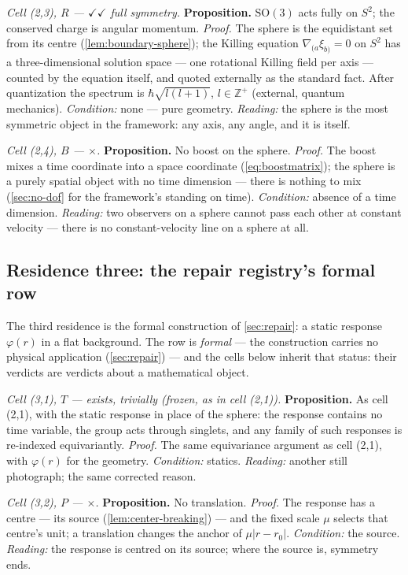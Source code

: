\documentclass[11pt]{amsbook}
\theoremstyle{plain}
\theoremstyle{definition}
\theoremstyle{remark}
\begin{document}
\emph{Cell (2,3), $R$ --- $\checkmark\checkmark$ full symmetry.} \textbf{Proposition.} $\mathrm{SO}(3)$ acts fully on $S^{2}$; the conserved charge is angular momentum. \emph{Proof.} The sphere is the equidistant set from its centre (\cref{lem:boundary-sphere}); the Killing equation $\nabla_{(a}\xi_{b)} = 0$ on $S^{2}$ has a three-dimensional solution space --- one rotational Killing field per axis --- counted by the equation itself, and quoted externally as the standard fact. After quantization the spectrum is $\hbar\sqrt{l(l+1)}$, $l \in \mathbb{Z}^{+}$ (external, quantum mechanics). \emph{Condition:} none --- pure geometry. \emph{Reading:} the sphere is the most symmetric object in the framework: any axis, any angle, and it is itself.

\emph{Cell (2,4), $B$ --- $\times$.} \textbf{Proposition.} No boost on the sphere. \emph{Proof.} The boost mixes a time coordinate into a space coordinate (\cref{eq:boostmatrix}); the sphere is a purely spatial object with no time dimension --- there is nothing to mix (\cref{sec:no-dof} for the framework's standing on time). \emph{Condition:} absence of a time dimension. \emph{Reading:} two observers on a sphere cannot pass each other at constant velocity --- there is no constant-velocity line on a sphere at all.

\subsection{Residence three: the repair registry's formal row}\label{sec:grid-repair}

The third residence is the formal construction of \cref{sec:repair}: a static response $\varphi(r)$ in a flat background. The row is \emph{formal} --- the construction carries no physical application (\cref{sec:repair}) --- and the cells below inherit that status: their verdicts are verdicts about a mathematical object.

\emph{Cell (3,1), $T$ --- exists, trivially (frozen, as in cell (2,1)).} \textbf{Proposition.} As cell (2,1), with the static response in place of the sphere: the response contains no time variable, the group acts through singlets, and any family of such responses is re-indexed equivariantly. \emph{Proof.} The same equivariance argument as cell (2,1), with $\varphi(r)$ for the geometry. \emph{Condition:} statics. \emph{Reading:} another still photograph; the same corrected reason.

\emph{Cell (3,2), $P$ --- $\times$.} \textbf{Proposition.} No translation. \emph{Proof.} The response has a centre --- its source (\cref{lem:center-breaking}) --- and the fixed scale $\mu$ selects that centre's unit; a translation changes the anchor of $\mu|r - r_{0}|$. \emph{Condition:} the source. \emph{Reading:} the response is centred on its source; where the source is, symmetry ends.
\end{document}
